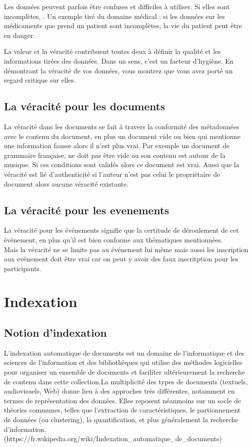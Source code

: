 \documentclass[12pt]{report}
\begin{document}
Les données peuvent parfois être confuses et difficiles à utiliser. Si elles sont incomplètes, . Un exemple tiré du domaine médical : si les données sur les médicaments que prend un patient sont incomplètes, la vie du patient peut être en danger.

La valeur et la véracité contribuent toutes deux à définir la qualité et les informations tirées des données. Dans un sens, c’est un facteur d’hygiène. En démontrant la véracité de vos données, vous montrez que vous avez porté un regard critique sur elles.

\subsection{La véracité pour les documents}

La véracité dans les documents se fait à travers la 
conformité des métadonnées avec le contenu du document, 
en plus un document vide ou bien qui mentionne une information 
fausse alors il n'est plus vrai.
Par exemple un document de grammaire 
française, ne doit pas être vide ou son contenu est 
autour de la musique. Si ces conditions sont validés alors ce 
document est vrai. 
Aussi que la véracité est lié d'authenticité si l'auteur 
n'est pas celui le propriétaire de document alors aucune 
véracité existante.
\subsection{La véracité pour les evenements}

La véracité pour les événements signifie que la certitude de 
déroulement de cet événement, en plus qu'il est bien conforme 
aux thématiques mentionnées. \\Mais la véracité ne se limite pas au
 événement lui même mais aussi les inscription aux evénement 
doit être vrai car on peut y avoir des faux inscritption pour 
les participants.

\section{Indexation}

\subsection{Notion d'indexation}

L'indexation automatique de documents est un domaine de l'informatique et des sciences de l'information et des bibliothèques qui utilise des méthodes logicielles pour organiser un ensemble de documents et faciliter ultérieurement la recherche de contenu dans cette collection.La multiplicité des types de documents (textuels, audiovisuels, Web) donne lieu à des approches très différentes, notamment en termes de représentation des données. Elles reposent néanmoins sur un socle de théories communes, telles que l'extraction de caractéristiques, le partionnement de données (ou clustering), la quantification, et plus généralement la recherche d'information.
\\(https://fr.wikipedia.org/wiki/Indexation\_automatique\_de\_documents)\\
\end{document}
